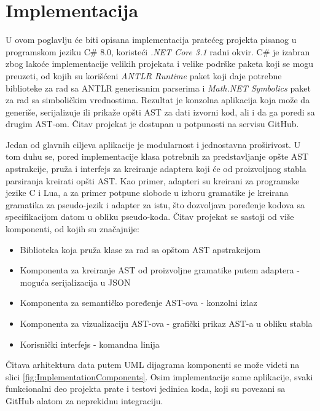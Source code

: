 \chapter{Implementacija}
\label{chp:Implementation}

U ovom poglavlju će biti opisana implementacija pratećeg projekta pisanog u programskom jeziku C\# 8.0, koristeći \emph{.NET Core 3.1} radni okvir. C\# je izabran zbog lakoće implementacije velikih projekata i velike podrške paketa koji se mogu preuzeti, od kojih su korišćeni \emph{ANTLR Runtime} paket koji daje potrebne biblioteke za rad sa ANTLR generisanim parserima i \emph{Math.NET Symbolics} paket za rad sa simboličkim vrednostima. Rezultat je konzolna aplikacija koja može da generiše, serijalizuje ili prikaže opšti AST za dati izvorni kod, ali i da ga poredi sa drugim AST-om. Čitav projekat je dostupan u potpunosti na servisu GitHub.

Jedan od glavnih ciljeva aplikacije je modularnost i jednostavna proširivost. U tom duhu se, pored implementacije klasa potrebnih za predstavljanje opšte AST apstrakcije, pruža i interfejs za kreiranje adaptera koji će od proizvoljnog stabla parsiranja kreirati opšti AST. Kao primer, adapteri su kreirani za programske jezike C i Lua, a za primer potpune slobode u izboru gramatike je kreirana gramatika za pseudo-jezik i adapter za istu, što dozvoljava poređenje kodova sa specifikacijom datom u obliku pseudo-koda. Čitav projekat se sastoji od više komponenti, od kojih su značajnije:
\begin{itemize}
    \item Biblioteka koja pruža klase za rad sa opštom AST apstrakcijom
    \item Komponenta za kreiranje AST od proizvoljne gramatike putem adaptera - moguća serijalizacija u JSON
    \item Komponenta za semantičko poređenje AST-ova - konzolni izlaz
    \item Komponenta za vizualizaciju AST-ova - grafički prikaz AST-a u obliku stabla
    \item Korisnički interfejs - komandna linija
\end{itemize}

Čitava arhitektura data putem UML dijagrama komponenti se može videti na slici \ref{fig:ImplementationComponents}. Osim implementacije same aplikacije, svaki funkcionalni deo projekta prate i testovi jedinica koda, koji su povezani sa GitHub alatom za neprekidnu integraciju.

